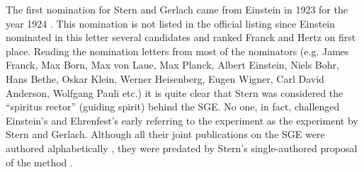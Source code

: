 \documentclass{article}
\begin{document}
The first nomination for Stern and Gerlach came from Einstein in 1923 for the year 1924 \cite[Doc.~132]{CPAE14}. This nomination is not listed in the official listing since Einstein nominated in this letter several candidates and ranked Franck and Hertz on first place. Reading the nomination letters from most of the nominators (e.g. James Franck, Max Born, Max von Laue, Max Planck, Albert Einstein, Niels Bohr, Hans Bethe, Oskar Klein, Werner Heisenberg, Eugen Wigner, Carl David Anderson, Wolfgang Pauli etc.) it is quite clear that Stern was considered the ``spiritus rector'' (guiding spirit) behind the SGE. No one, in fact, challenged Einstein's and Ehrenfest's early referring to the experiment as the experiment by Stern and Gerlach. Although all their joint publications on the SGE were authored alphabetically \citep{GerlachWEtal1921Nachweis,GerlachWEtal1922Moment,GerlachWEtal1922Nachweis,GerlachWEtal1924Richtungsquantelung}, they were predated by Stern's single-authored proposal of the method \citep{SternO1921Weg}.
\end{document}
